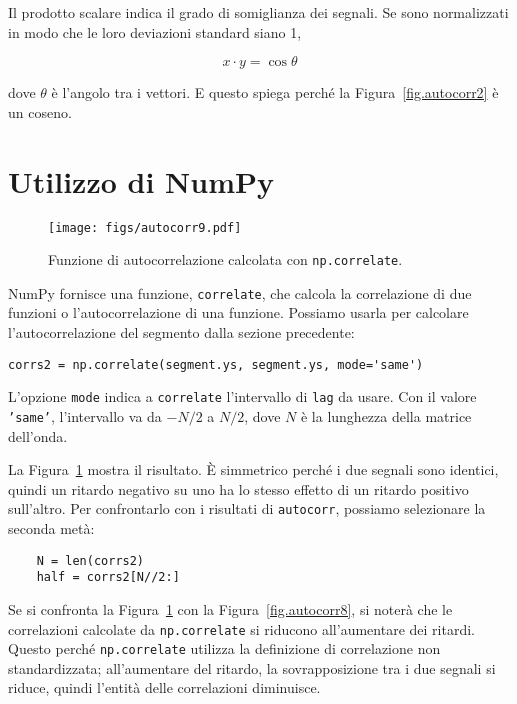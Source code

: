 \documentclass[12pt]{book} \usepackage[width=5.5in,height=8.5in, hmarginratio=3:2,vmarginratio=1:1]{geometry}
\begin{document}
\newcommand{\norm}{\mathrm{norm}}

Il prodotto scalare indica il grado di somiglianza dei segnali. Se sono normalizzati in modo che le loro deviazioni standard siano 1,

%
\[ x \cdot y = \cos \theta \] 

%
dove $\theta$ è l'angolo tra i vettori. E questo spiega perché la Figura~\ref{fig.autocorr2} è un coseno.

\section{Utilizzo di NumPy} \label{correlate} 

\begin{figure} 

\centerline{\texttt{[image: figs/autocorr9.pdf]}} \caption{Funzione di autocorrelazione calcolata con {\tt np.correlate}.} \label{fig.autocorr9} \end{figure} 

NumPy fornisce una funzione, {\tt correlate}, che calcola la correlazione di due funzioni o l'autocorrelazione di una funzione. Possiamo usarla per calcolare l'autocorrelazione del segmento dalla sezione precedente:

\begin{verbatim} 
corrs2 = np.correlate(segment.ys, segment.ys, mode='same')
 \end{verbatim} 

L'opzione {\tt mode} indica a {\tt correlate} l'intervallo di {\tt lag} da usare. Con il valore {\tt 'same'}, l'intervallo va da $-N/2$ a $N/2$, dove $N$ è la lunghezza della matrice dell'onda.

La Figura~\ref{fig.autocorr9} mostra il risultato. È simmetrico perché i due segnali sono identici, quindi un ritardo negativo su uno ha lo stesso effetto di un ritardo positivo sull'altro. Per confrontarlo con i risultati di {\tt autocorr}, possiamo selezionare la seconda metà:

\begin{verbatim} 
    N = len(corrs2)
    half = corrs2[N//2:]
 \end{verbatim} 

Se si confronta la Figura~\ref{fig.autocorr9} con la Figura~\ref{fig.autocorr8}, si noterà che le correlazioni calcolate da {\tt np.correlate} si riducono all'aumentare dei ritardi. Questo perché {\tt np.correlate} utilizza la definizione di correlazione non standardizzata; all'aumentare del ritardo, la sovrapposizione tra i due segnali si riduce, quindi l'entità delle correlazioni diminuisce.
\end{document}

